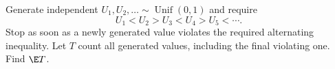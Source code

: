 Generate independent $U_1,U_2,\ldots\sim\operatorname{Unif}(0,1)$ and require
\[
U_1<U_2>U_3<U_4>U_5<\cdots.
\]
Stop as soon as a newly generated value violates the required alternating inequality. Let $T$ count all generated values, including the final violating one. Find $\E T$.
